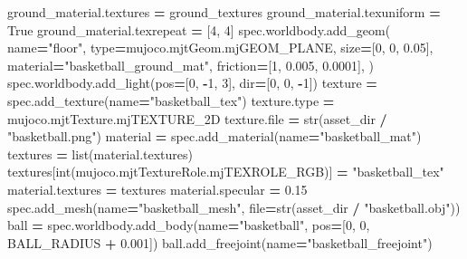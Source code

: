 \documentclass[
  chinese,
  11pt,
  letterpaper,
]{article}
\newenvironment{Shaded}{\begin{snugshade}}{\end{snugshade}}
\newcommand{\BuiltInTok}[1]{#1}
\newcommand{\DecValTok}[1]{\textcolor[rgb]{0.00,0.00,0.81}{#1}}
\newcommand{\FloatTok}[1]{\textcolor[rgb]{0.00,0.00,0.81}{#1}}
\newcommand{\NormalTok}[1]{#1}
\newcommand{\OperatorTok}[1]{\textcolor[rgb]{0.81,0.36,0.00}{\textbf{#1}}}
\newcommand{\StringTok}[1]{\textcolor[rgb]{0.31,0.60,0.02}{#1}}
\newcommand{\VariableTok}[1]{\textcolor[rgb]{0.00,0.00,0.00}{#1}}
\renewenvironment{Shaded}{\par\smallskip}{\par\smallskip}
\begin{document}
\begin{Shaded}
\begin{Highlighting}[]
\NormalTok{    ground\_material.textures }\OperatorTok{=}\NormalTok{ ground\_textures}
\NormalTok{    ground\_material.texuniform }\OperatorTok{=} \VariableTok{True}
\NormalTok{    ground\_material.texrepeat }\OperatorTok{=}\NormalTok{ [}\DecValTok{4}\NormalTok{, }\DecValTok{4}\NormalTok{]}
\NormalTok{    spec.worldbody.add\_geom(}
\NormalTok{        name}\OperatorTok{=}\StringTok{"floor"}\NormalTok{, }\BuiltInTok{type}\OperatorTok{=}\NormalTok{mujoco.mjtGeom.mjGEOM\_PLANE,}
\NormalTok{        size}\OperatorTok{=}\NormalTok{[}\DecValTok{0}\NormalTok{, }\DecValTok{0}\NormalTok{, }\FloatTok{0.05}\NormalTok{], material}\OperatorTok{=}\StringTok{"basketball\_ground\_mat"}\NormalTok{,}
\NormalTok{        friction}\OperatorTok{=}\NormalTok{[}\DecValTok{1}\NormalTok{, }\FloatTok{0.005}\NormalTok{, }\FloatTok{0.0001}\NormalTok{],}
\NormalTok{    )}
\NormalTok{    spec.worldbody.add\_light(pos}\OperatorTok{=}\NormalTok{[}\DecValTok{0}\NormalTok{, }\OperatorTok{{-}}\DecValTok{1}\NormalTok{, }\DecValTok{3}\NormalTok{], }\BuiltInTok{dir}\OperatorTok{=}\NormalTok{[}\DecValTok{0}\NormalTok{, }\DecValTok{0}\NormalTok{, }\OperatorTok{{-}}\DecValTok{1}\NormalTok{])}
\NormalTok{    texture }\OperatorTok{=}\NormalTok{ spec.add\_texture(name}\OperatorTok{=}\StringTok{"basketball\_tex"}\NormalTok{)}
\NormalTok{    texture.}\BuiltInTok{type} \OperatorTok{=}\NormalTok{ mujoco.mjtTexture.mjTEXTURE\_2D}
\NormalTok{    texture.}\BuiltInTok{file} \OperatorTok{=} \BuiltInTok{str}\NormalTok{(asset\_dir }\OperatorTok{/} \StringTok{"basketball.png"}\NormalTok{)}
\NormalTok{    material }\OperatorTok{=}\NormalTok{ spec.add\_material(name}\OperatorTok{=}\StringTok{"basketball\_mat"}\NormalTok{)}
\NormalTok{    textures }\OperatorTok{=} \BuiltInTok{list}\NormalTok{(material.textures)}
\NormalTok{    textures[}\BuiltInTok{int}\NormalTok{(mujoco.mjtTextureRole.mjTEXROLE\_RGB)] }\OperatorTok{=} \StringTok{"basketball\_tex"}
\NormalTok{    material.textures }\OperatorTok{=}\NormalTok{ textures}
\NormalTok{    material.specular }\OperatorTok{=} \FloatTok{0.15}
\NormalTok{    spec.add\_mesh(name}\OperatorTok{=}\StringTok{"basketball\_mesh"}\NormalTok{, }\BuiltInTok{file}\OperatorTok{=}\BuiltInTok{str}\NormalTok{(asset\_dir }\OperatorTok{/} \StringTok{"basketball.obj"}\NormalTok{))}
\NormalTok{    ball }\OperatorTok{=}\NormalTok{ spec.worldbody.add\_body(name}\OperatorTok{=}\StringTok{"basketball"}\NormalTok{, pos}\OperatorTok{=}\NormalTok{[}\DecValTok{0}\NormalTok{, }\DecValTok{0}\NormalTok{, BALL\_RADIUS }\OperatorTok{+} \FloatTok{0.001}\NormalTok{])}
\NormalTok{    ball.add\_freejoint(name}\OperatorTok{=}\StringTok{"basketball\_freejoint"}\NormalTok{)}

\end{Highlighting}
\end{Shaded}
\end{document}
